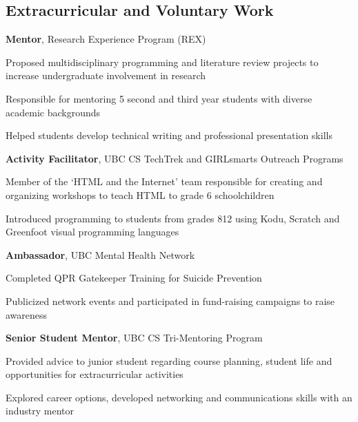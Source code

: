 \documentclass[margin,line]{res}
\newenvironment{list3}{
  \begin{list}{\textopenbullet}{
      \setlength{\itemsep}{0in}
      \setlength{\parsep}{0in} \setlength{\parskip}{0in}
      \setlength{\topsep}{0in} \setlength{\partopsep}{0in} 
      \setlength{\leftmargin}{0.1in}}}{\end{list}}
\begin{document}
\begin{resume}
\vspace*{.4cm}

\section{\sc Extracurricular and Voluntary Work}

{\bf Mentor}, Research Experience Program (REX)\\
\vspace*{-.3cm}
\begin{list3}
\item Proposed multidisciplinary programming and literature review projects to increase undergraduate involvement in research
\item Responsible for mentoring 5 second and third year students with diverse academic backgrounds
\item Helped students develop technical writing and professional presentation skills
\end{list3}
\vspace*{.05cm}

{\bf Activity Facilitator}, UBC CS TechTrek and GIRLsmarts Outreach Programs\\
\vspace*{-.3cm}
\begin{list3}
\item Member of the `HTML and the Internet' team responsible for creating and organizing workshops to teach HTML to grade 6 schoolchildren
\item Introduced programming to students from grades 8{\textendash}12 using Kodu, Scratch and Greenfoot visual programming languages
\end{list3}
\vspace*{.05cm}

{\bf Ambassador}, UBC Mental Health Network\\
\vspace*{-.3cm}
\begin{list3}
\item Completed QPR Gatekeeper Training for Suicide Prevention
\item Publicized network events and participated in fund-raising campaigns to raise awareness
\end{list3}
\vspace*{.05cm}

{\bf Senior Student Mentor}, UBC CS Tri-Mentoring Program\\
\vspace*{-.3cm}
\begin{list3}
\item Provided advice to junior student regarding course planning, student life and opportunities for extracurricular activities
\item Explored career options, developed networking and communications skills with an industry mentor
\end{list3}
\vspace*{.05cm}


\end{resume}
\end{document}
